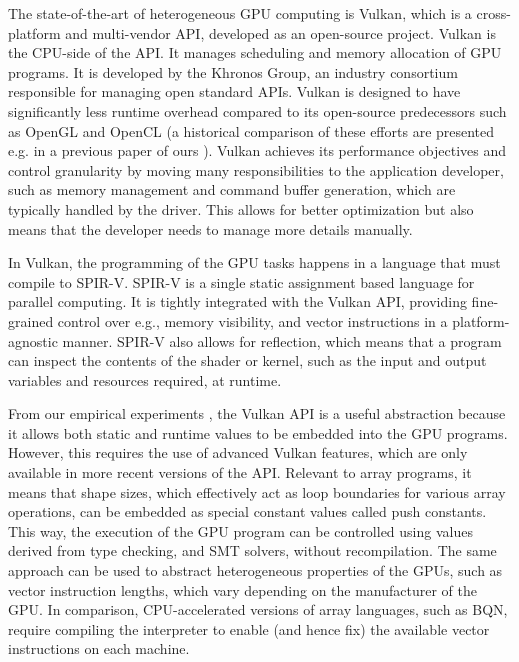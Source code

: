 \documentclass[10pt,a4paper]{article}
\begin{document}
The state-of-the-art of heterogeneous GPU computing is Vulkan, which is a cross-platform and multi-vendor API, developed as an open-source project.
Vulkan is the CPU-side of the API.
It manages scheduling and memory allocation of GPU programs.
It is developed by the Khronos Group, an industry consortium responsible for managing open standard APIs.
Vulkan is designed to have significantly less runtime overhead compared to its open-source predecessors such as OpenGL and OpenCL (a historical comparison of these efforts are presented e.g. in a previous paper of ours \cite{InteroperableGHaavis2020}).
Vulkan achieves its performance objectives and control granularity by moving many responsibilities to the application developer, such as memory management and command buffer generation, which are typically handled by the driver.
This allows for better optimization but also means that the developer needs to manage more details manually.

In Vulkan, the programming of the GPU tasks happens in a language that must compile to SPIR-V.
SPIR-V is a single static assignment \cite{SsaIsFunctionAppel1998} based language for parallel computing.
It is tightly integrated with the Vulkan API, providing fine-grained control over e.g., memory visibility, and vector instructions in a platform-agnostic manner.
SPIR-V also allows for reflection, which means that a program can inspect the contents of the shader or kernel, such as the input and output variables and resources required, at runtime.

From our empirical experiments \cite{UnleashingGpusHaavis2022}, the Vulkan API is a useful abstraction because it allows both static and runtime values to be embedded into the GPU programs.
However, this requires the use of advanced Vulkan features, which are only available in more recent versions of the API.
Relevant to array programs, it means that shape sizes, which effectively act as loop boundaries for various array operations, can be embedded as special constant values called push constants.
This way, the execution of the GPU program can be controlled using values derived from type checking, and SMT solvers, without recompilation.
The same approach can be used to abstract heterogeneous properties of the GPUs, such as vector instruction lengths, which vary depending on the manufacturer of the GPU.
In comparison, CPU-accelerated versions of array languages, such as BQN, require compiling the interpreter to enable (and hence fix) the available vector instructions on each machine.
\end{document}
